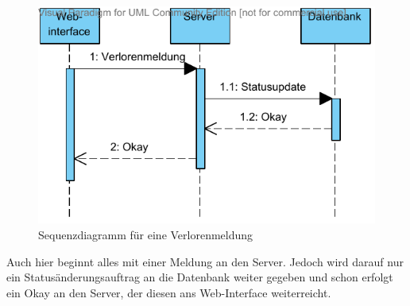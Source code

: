 \begin{figure}[H]
\begin{center}
\includegraphics[width=0.8\linewidth]{bilder/seq-verloren.pdf}
\caption{Sequenzdiagramm für eine Verlorenmeldung}
\label{fig:225}
\end{center}
\end{figure}
Auch hier beginnt alles mit einer Meldung an den Server. Jedoch wird darauf nur ein Statusänderungsauftrag an die Datenbank weiter gegeben und schon erfolgt ein Okay an den Server, der diesen ans Web-Interface weiterreicht.